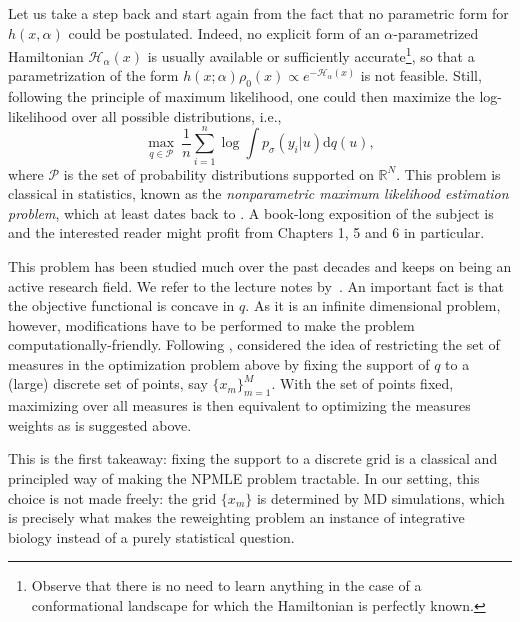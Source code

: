 \documentclass[12pt]{iopart}
\providecommand{\reals}{\mathbb{R}}
\providecommand{\diff}{\mathrm{d}}
\theoremstyle{remark}
\begin{document}
Let us take a step back and start again from the fact that no parametric form for $h(x,\alpha)$ could be postulated. Indeed, no explicit form of an $\alpha$-parametrized Hamiltonian $\mathcal{H}_\alpha(x)$ is usually available or sufficiently accurate\footnote{Observe that there is no need to learn anything in the case of a conformational landscape for which the Hamiltonian is perfectly known.}, so that a parametrization of the form $h(x; \alpha)\rho_0(x) \propto e^{-\mathcal{H}_\alpha(x)}$ is not feasible. Still, following the principle of maximum likelihood, one could then maximize the log-likelihood over all possible distributions, i.e., 
\begin{equation}
\label{eq: NPMLE}
\max_{q \in \mathcal{P}}\ \frac 1n \sum_{i=1}^n \log \int p_\sigma( y_i \vert u) \diff q(u),
\end{equation}
where  $\mathcal{P}$ is the set of probability distributions supported on $\reals^{N}$. This problem
 is classical in statistics, known as the \emph{nonparametric maximum likelihood estimation problem}, which at least dates back to \citet{robbins1950generalization}. A book-long exposition of the subject is \citet{lindsay1995mixture} and the interested reader might profit from Chapters 1, 5 and 6 in particular.


 

This problem has been studied much over the past decades and keeps on being an active research field. We refer to the lecture notes by~\citet{ignatiadis2024empirical}.
An important fact is that the objective functional is concave in $q$. As it is an infinite dimensional problem, however, modifications have to be performed to make the problem computationally-friendly. 
Following \citet{laird1978nonparametric}, \citet{jiang2009general} considered the idea of restricting the set of measures in the optimization problem above by fixing the support of $q$ to a (large) discrete set of points, say $\{x_m\}_{m=1}^M$. With the set of points fixed, maximizing over all measures is then equivalent to optimizing the measures weights as is suggested above. 

This is the first takeaway: fixing the support to a discrete grid is a classical and principled way of making the NPMLE problem tractable. In our setting, this choice is not made freely: the grid $\{x_m\}$ is determined by MD simulations, which is precisely what makes the reweighting problem an instance of integrative biology instead of a purely statistical question.
\end{document}
